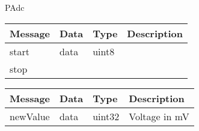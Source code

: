  {PAdc}

\begin{tabular}[ht]{|l|l|l|p{8cm}|}
\hline
Message & Data & Type & Description\\
\hline
start &  data  &  uint8  & \\
\hline
stop &  &  & \\
\hline
\end{tabular}
\begin{tabular}[ht]{|l|l|l|p{8cm}|}
\hline
Message & Data & Type & Description\\
\hline
newValue &  data  &  uint32  & %
Voltage in mV
\\
\hline
\end{tabular}
